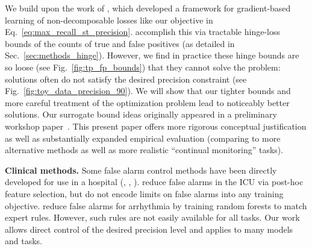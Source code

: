 We build upon the work of \citet{ebanScalableLearningNonDecomposable2017}, which developed a framework for gradient-based learning of non-decomposable losses like our objective in Eq.~\eqref{eq:max_recall_st_precision}.
\citeauthor{ebanScalableLearningNonDecomposable2017} accomplish this via tractable hinge-loss bounds of the counts of true and false positives (as detailed in Sec.~\ref{sec:methods_hinge}).
However, we find in practice these hinge bounds are so loose (see Fig.~\ref{fig:tp_fp_bounds}) that they cannot solve the problem: solutions often do not satisfy the desired precision constraint (see Fig.~\ref{fig:toy_data_precision_90}).  We will show that our tighter bounds and more careful treatment of the optimization problem lead to noticeably better solutions.
Our surrogate bound ideas originally appeared in a preliminary workshop paper~\citep{rathOptimizingClinicalEarly2021}.
This present paper offers more rigorous conceptual justification as well as substantially expanded empirical evaluation (comparing to more alternative methods as well as more realistic ``continual monitoring'' tasks).



\textbf{Clinical methods.}
Some false alarm control methods have been directly developed for use in a hospital (\citet{chambrin2001alarms}, \citet{antink2016reducing}, \citet{eerikainen2016reduction}).
\citet{au2019reduction} reduce false alarms in the ICU via post-hoc feature selection, but do not encode limits on false alarms into any training objective.
\citet{hever2019machine} reduce false alarms for arrhythmia by training random forests to match expert rules. However, such rules are not easily available for all tasks.
Our work allows direct control of the desired precision level and applies to many models and tasks.



